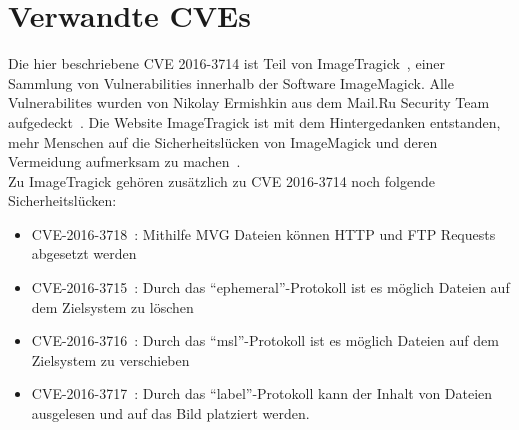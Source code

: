 \newpage
\section{Verwandte CVEs}\label{sec:verwandte-cves}

Die hier beschriebene CVE 2016-3714 ist Teil von ImageTragick~\cite{ImageTragick}, einer Sammlung von Vulnerabilities
innerhalb der Software ImageMagick.
Alle Vulnerabilites wurden von Nikolay Ermishkin aus dem Mail.Ru Security Team aufgedeckt~\cite{ImageTragick}.
Die Website ImageTragick ist mit dem Hintergedanken entstanden,
mehr Menschen auf die Sicherheitslücken von ImageMagick und deren Vermeidung aufmerksam zu machen~\cite{ImageTragick}.\\

Zu ImageTragick gehören zusätzlich zu CVE 2016-3714 noch folgende Sicherheitslücken:

\begin{itemize}
    \item CVE-2016-3718~\cite{CVE20163718HTTPFTP}: Mithilfe MVG Dateien können HTTP und FTP Requests abgesetzt werden
    \item CVE-2016-3715~\cite{CVE20163715EPHEMERALCoder}: Durch das "`ephemeral"'-Protokoll ist es möglich Dateien auf dem Zielsystem zu löschen
    \item CVE-2016-3716~\cite{CVE20163716MSLCoder}: Durch das "`msl"'-Protokoll ist es möglich Dateien auf dem Zielsystem zu verschieben
    \item CVE-2016-3717~\cite{CVE20163717LABELCoder}: Durch das "`label"'-Protokoll kann der Inhalt von Dateien ausgelesen und auf das Bild platziert werden.
\end{itemize}